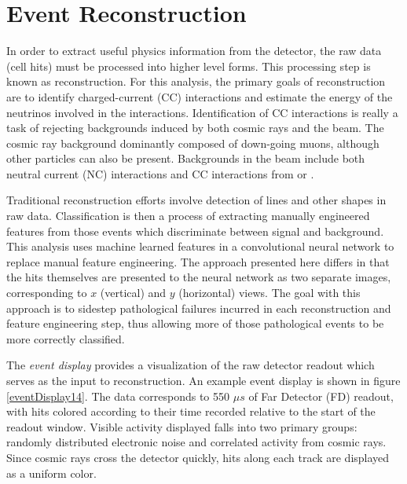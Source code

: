 \chapter{Event Reconstruction}
\label{reconstruction_chapter}

In order to extract useful physics information from the \nova detector, the raw
data (cell hits) must be processed into higher level forms.
This processing step is known as reconstruction.
For this analysis, the primary goals of reconstruction are to identify \numu
charged-current (CC) interactions and estimate the energy of the neutrinos involved in the interactions. Identification of \numu CC interactions is really
a task of rejecting backgrounds induced by both cosmic rays and the \numi beam.  The cosmic ray background dominantly composed of down-going muons,
although other particles can also be present.  Backgrounds in the \numi beam
include both neutral current (NC) interactions and CC interactions from \nue or
\nutau.

Traditional reconstruction efforts involve detection of lines and other shapes
in raw data.  Classification is then a process of extracting manually
engineered features from those events which discriminate between signal and
background.
This analysis uses machine learned features in a convolutional neural network
to replace manual feature engineering.
The approach presented here differs in that the hits themselves are presented
to the neural network as two separate images, corresponding to $x$ (vertical)
and $y$ (horizontal) views.
The goal with this approach is to sidestep pathological failures incurred in each reconstruction and feature engineering step, thus allowing more of those pathological events to be more correctly classified.

The \nova \textit{event display} provides a visualization of the raw detector readout which serves as the input to reconstruction.
An example event display is shown in figure \ref{eventDisplay14}.
The data corresponds to 550 $\mu s$ of Far Detector (FD) readout, with hits colored according to their time recorded relative to the start of the readout window.
Visible activity displayed falls into two primary groups: randomly distributed electronic noise and correlated activity from cosmic rays.
Since cosmic rays cross the detector quickly, hits along each track are displayed as a uniform color.

